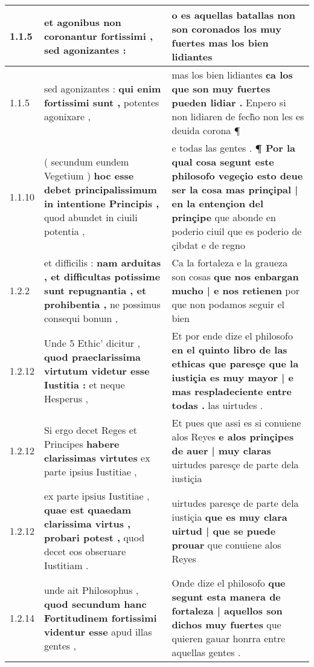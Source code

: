 \begin{tabular}{|p{1cm}|p{6.5cm}|p{6.5cm}|}

\hline
1.1.5 & et agonibus \textbf{ non coronantur fortissimi , } sed agonizantes : & o es aquellas batallas \textbf{ non son coronados los muy fuertes } mas los bien lidiantes \\\hline
1.1.5 & sed agonizantes : \textbf{ qui enim fortissimi sunt , } potentes agonixare , & mas los bien lidiantes \textbf{ ca los que son muy fuertes pueden lidiar . } Enpero si non lidiaren de fech̃o non les es deuida corona ¶ \\\hline
1.1.10 & ( secundum eundem Vegetium ) \textbf{ hoc esse debet principalissimum in intentione Principis , } quod abundet in ciuili potentia , & e todas las gentes . \textbf{ ¶ Por la qual cosa segunt este philosofo vegeçio esto deue ser la cosa mas prinçipal | en la entençion del prinçipe } que abonde en poderio ciuil que es poderio de çibdat e de regno \\\hline
1.2.2 & et difficilis : \textbf{ nam arduitas , et difficultas potissime sunt repugnantia , et prohibentia , } ne possimus consequi bonum , & Ca la fortaleza e la graueza son cosas \textbf{ que nos enbargan mucho | e nos retienen } por que non podamos seguir el bien \\\hline
1.2.12 & Unde 5 Ethic’ dicitur , \textbf{ quod praeclarissima virtutum videtur esse Iustitia : } et neque Hesperus , & Et por ende dize el philosofo \textbf{ en el quinto libro de las ethicas que paresçe que la iustiçia es muy mayor | e mas respladeciente entre todas . } las uirtudes . \\\hline
1.2.12 & Si ergo decet Reges et Principes \textbf{ habere clarissimas virtutes } ex parte ipsius Iustitiae , & Et pues que assi es si conuiene alos Reyes \textbf{ e alos prinçipes de auer | muy claras } uirtudes paresçe de parte dela iustiçia \\\hline
1.2.12 & ex parte ipsius Iustitiae , \textbf{ quae est quaedam clarissima virtus , probari potest , } quod decet eos obseruare Iustitiam . & uirtudes paresçe de parte dela iustiçia \textbf{ que es muy clara uirtud | que se puede prouar } que conuiene alos Reyes \\\hline
1.2.14 & unde ait Philosophus , \textbf{ quod secundum hanc Fortitudinem fortissimi videntur esse } apud illas gentes , & Onde dize el philosofo \textbf{ que segunt esta manera de fortaleza | aquellos son dichos muy fuertes } que quieren gauar honrra entre aquellas gentes . \\\hline

\end{tabular}
